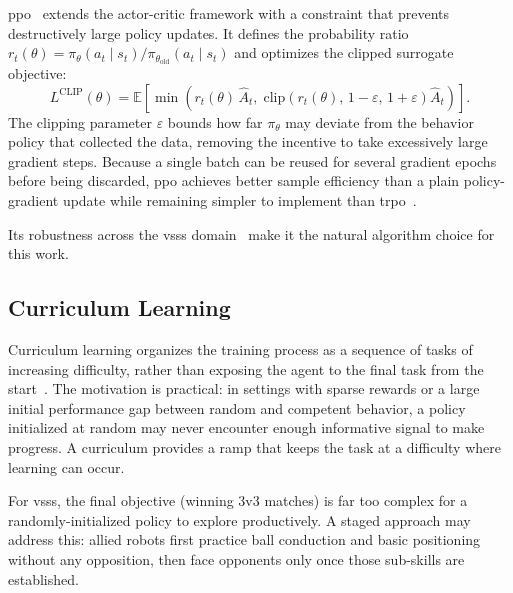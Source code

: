 \gls{ppo}~\cite{schulman2017ppo} extends the actor-critic framework with a
constraint that prevents destructively large policy updates.  It defines the
probability ratio $r_t(\theta) = \pi_\theta(a_t \mid s_t) /
\pi_{\theta_\mathrm{old}}(a_t \mid s_t)$ and optimizes the clipped surrogate
objective:
%
\begin{equation}
    L^{\mathrm{CLIP}}(\theta) =
    \mathbb{E}\!\left[
        \min\!\left(
            r_t(\theta)\,\hat{A}_t,\;
            \mathrm{clip}\!\left(r_t(\theta),\,1-\varepsilon,\,1+\varepsilon\right)
            \hat{A}_t
        \right)
    \right].
    \label{eq:ppo}
\end{equation}
%
The clipping parameter $\varepsilon$ bounds how far $\pi_\theta$ may deviate
from the behavior policy that collected the data, removing the incentive to
take excessively large gradient steps.  Because a single batch can be reused
for several gradient epochs before being discarded, \gls{ppo} achieves better
sample efficiency than a plain policy-gradient update while remaining simpler
to implement than \gls{trpo}~\cite{schulman2015trpo}.


Its robustness across the \gls{vsss} domain~\cite{tg_thiago,tg_thay,brandao2022} make it the
natural algorithm choice for this work.

\subsection{Curriculum Learning}

Curriculum learning organizes the training process as a sequence of tasks of
increasing difficulty, rather than exposing the agent to the final task from
the start~\cite{bengio2009curriculum}.  The motivation is practical: in
settings with sparse rewards or a large initial performance gap between random
and competent behavior, a policy initialized at random may never encounter
enough informative signal to make progress.  A curriculum provides a ramp that
keeps the task at a difficulty where learning can occur.

For \gls{vsss}, the final objective (winning 3v3 matches) is far too complex
for a randomly-initialized policy to explore productively.  A staged approach
may address this: allied robots first practice ball conduction and basic
positioning without any opposition, then face opponents only once those
sub-skills are established.

